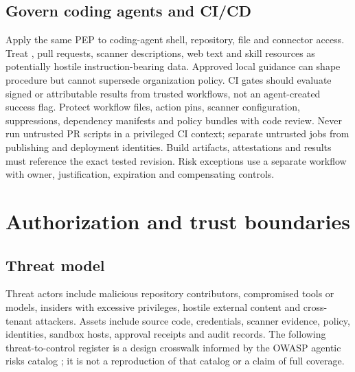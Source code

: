\documentclass[11pt,letterpaper]{article}
\begin{document}
\subsection{Govern coding agents and CI/CD}
Apply the same PEP to coding-agent shell, repository, file and connector access. Treat , pull requests, scanner descriptions, web text and skill resources as potentially hostile instruction-bearing data. Approved local guidance can shape procedure but cannot supersede organization policy. CI gates should evaluate signed or attributable results from trusted workflows, not an agent-created success flag. Protect workflow files, action pins, scanner configuration, suppressions, dependency manifests and policy bundles with code review. Never run untrusted PR scripts in a privileged CI context; separate untrusted jobs from publishing and deployment identities. Build artifacts, attestations and results must reference the exact tested revision. Risk exceptions use a separate workflow with owner, justification, expiration and compensating controls.

\section{Authorization and trust boundaries}
\subsection{Threat model}
Threat actors include malicious repository contributors, compromised tools or models, insiders with excessive privileges, hostile external content and cross-tenant attackers. Assets include source code, credentials, scanner evidence, policy, identities, sandbox hosts, approval receipts and audit records. The following threat-to-control register is a design crosswalk informed by the OWASP agentic risks catalog \cite{owasp}; it is not a reproduction of that catalog or a claim of full coverage.
\end{document}
